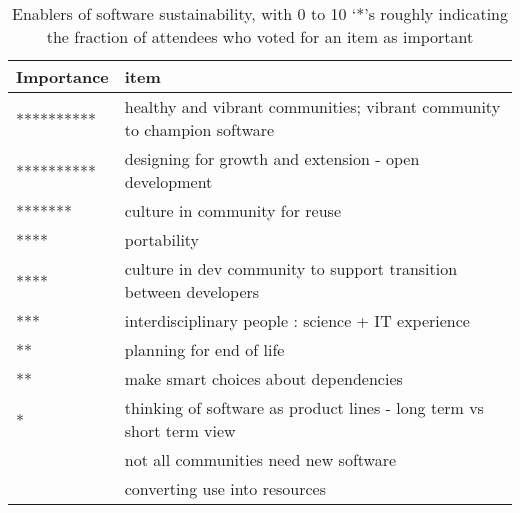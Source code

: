 \documentclass[11pt, oneside]{amsart}
\begin{document}
\begin{table*}[ht]
\begin{center}
    \caption{Enablers of software sustainability, with 0 to 10 `*'s roughly indicating the fraction of attendees who voted for an item as important}
    \begin{scriptsize}
    \begin{tabular}{ | p{1.65cm} | p{10.0cm} |}
    \hline
  Importance & item \\ \hline \hline
********** & healthy and vibrant communities; vibrant community to champion software \\ \hline
********** & designing for growth and extension - open development \\ \hline
******* & culture in community for reuse \\ \hline
**** & portability \\ \hline
**** & culture in dev community to support transition between developers \\ \hline
*** & interdisciplinary people : science + IT experience \\ \hline
** & planning for end of life \\ \hline
** & make smart choices about dependencies \\ \hline
* & thinking of software as product lines - long term vs short term view \\ \hline
 & not all communities need new software \\ \hline
 & converting use into resources \\ \hline
    \end{tabular}
    \end{scriptsize}
    \label{tb:software_sustainability_enablers}
\end{center}   
\end{table*} 
\end{document}
